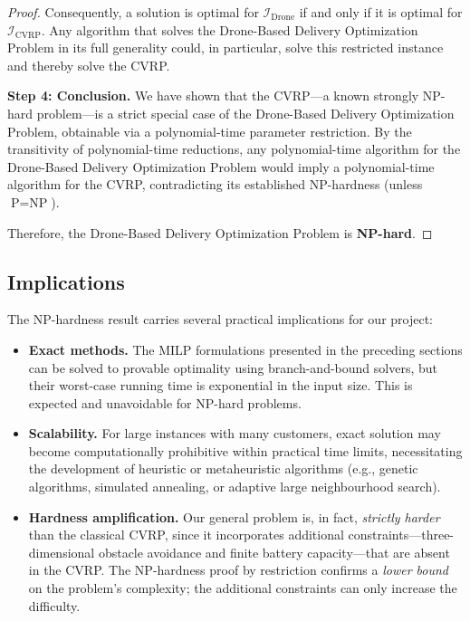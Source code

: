 \documentclass[11pt,a4paper]{article}
\begin{document}
\begin{proof}
\noindent Consequently, a solution is optimal for $\mathcal{I}_{\text{Drone}}$ if and only if it is optimal for $\mathcal{I}_{\text{CVRP}}$. Any algorithm that solves the Drone-Based Delivery Optimization Problem in its full generality could, in particular, solve this restricted instance and thereby solve the CVRP.

\medskip

\noindent\textbf{Step 4: Conclusion.}\quad
We have shown that the CVRP---a known strongly NP-hard problem---is a strict special case of the Drone-Based Delivery Optimization Problem, obtainable via a polynomial-time parameter restriction. By the transitivity of polynomial-time reductions, any polynomial-time algorithm for the Drone-Based Delivery Optimization Problem would imply a polynomial-time algorithm for the CVRP, contradicting its established NP-hardness (unless $\text{P} = \text{NP}$).

Therefore, the Drone-Based Delivery Optimization Problem is \textbf{NP-hard}.\qedhere
\end{proof}

\subsection{Implications}

The NP-hardness result carries several practical implications for our project:

\begin{itemize}
  \item \textbf{Exact methods.} The MILP formulations presented in the preceding sections can be solved to provable optimality using branch-and-bound solvers, but their worst-case running time is exponential in the input size. This is expected and unavoidable for NP-hard problems.
  \item \textbf{Scalability.} For large instances with many customers, exact solution may become computationally prohibitive within practical time limits, necessitating the development of heuristic or metaheuristic algorithms (e.g., genetic algorithms, simulated annealing, or adaptive large neighbourhood search).
  \item \textbf{Hardness amplification.} Our general problem is, in fact, \emph{strictly harder} than the classical CVRP, since it incorporates additional constraints---three-dimensional obstacle avoidance and finite battery capacity---that are absent in the CVRP. The NP-hardness proof by restriction confirms a \emph{lower bound} on the problem's complexity; the additional constraints can only increase the difficulty.
\end{itemize}
\end{document}
